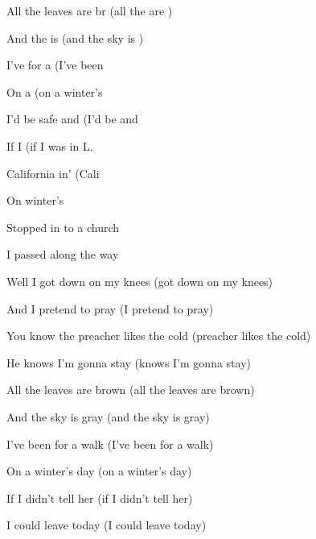 
\zs
All {the} leaves are br (all the  are )

And the  is  (and the sky is )

I've  for a  (I've been  

On a    (on a winter's 

I'd {be} safe and  (I'd be  and 

If I    (if I was in L.

\ks

\zr
Cali{fornia} in' (Cali 

On  winter's  
\kr

\zs
Stopped in to a church

I passed along the way

Well I got down on my knees (got down on my knees)

And I pretend to pray (I pretend to pray)

You know the preacher likes the cold (preacher likes the cold)

He knows I'm gonna stay (knows I'm gonna stay)

\ks
\zr

\kr
\zs

All the leaves are brown (all the leaves are brown)

And the sky is gray   (and the sky is gray)

I've been for a walk (I've been for a walk)

On a winter's day  (on a winter's day)

If I didn't tell her   (if I didn't tell her)

I could leave today (I could leave today)

\ks

\zr
\kr

\zr
\kr
\kp


